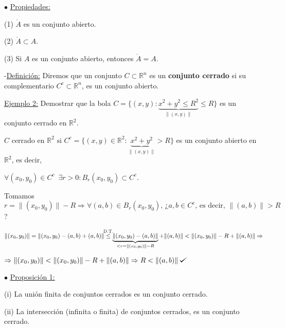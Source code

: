 \documentclass[10pt, titlepage]{article}
\def\checkmark{\tikz\fill[scale=0.4](0,.35) -- (.25,0) -- (1,.7) -- (.25,.15) -- cycle;}
\newcommand{\leqc}[1]{\stackrel{\mathclap{\normalfont\mbox{\scriptsize{#1}}}}{\leq}}
\newcommand{\R}{\mathbb{R}}
\newcommand{\spac}{\, \, \,}
\newcommand{\definicion}{\noindent-\underline{Definición:} }
\newcommand{\proposicion}[1][\!\!]{\noindent$\bullet$ \underline{Proposición #1:} }
\begin{document}
\noindent$\bullet$ \underline{Propiedades:}
\vspace{3mm}

(1) $\mathring{A}$ es un conjunto abierto.
\vspace{3mm}

(2) $\mathring{A} \subset A$.
\vspace{3mm}

(3) Si $A$ es un conjunto abierto, entonces $\mathring{A} = A$.
\vspace{5mm}


\definicion Diremos que un conjunto $C \subset \R^n$ es un \textbf{conjunto cerrado} si su complementario 
$C^c \subset \R^n$, es un conjunto abierto.
\vspace{3mm}

\underline{Ejemplo 2:} Demostrar que la bola $C = \{ (x, y) : \underbrace{x^2 + y^2 \leq R^2}_{\|(x, y
)\|} \leq R\}$ es un conjunto cerrado en $\R^2$.
\vspace{3mm}

$C$  cerrado en $\R^2 \text{ si } C^c = \{(x, y) \in \R^2 : \underbrace{x^2 + y^2}_{\|(x, y)\|} > R\}$ es
 un conjunto abierto en $\R^2$, es decir, 

$\forall (x_0, y_0) \in C^c \spac \exists r > 0 : B_r (x_0, y_0) \subset C^c$.
\vspace{3mm}

Tomamos $r = \| (x_0, y_0) \| - R \Rightarrow \forall (a, b) \in B_r (x_0, y_0) \text{, ¿} a, b \in C^c 
\text{, es decir, } \| (a, b) \| >R$?
\vspace{2mm}

$\| (x_0, y_0) \| = \| (x_0, y_0) - (a, b) + (a, b) \| \leqc{D.T.} \underbrace{\| (x_0, y_0) - (a, b) \|}_{< r =
 \| (x_0, y_0) \| - R} + \| (a, b) \| < \| (x_0, y_0) \| - R + \| (a, b) \| \Rightarrow$

$\Rightarrow \| (x_0, y_0) \| < \| (x_0, y_0) \| - R + \| (a, b) \| \Rightarrow R < \| (a, b) \| \, \checkmark$
\vspace{7mm}

\proposicion[1]
\vspace{3mm}

(i) La unión finita de conjuntos cerrados es un conjunto cerrado.
\vspace{3mm}

(ii) La intersección (infinita o finita) de conjuntos cerrados, es un conjunto cerrado.
\vspace{5mm}
\end{document}
